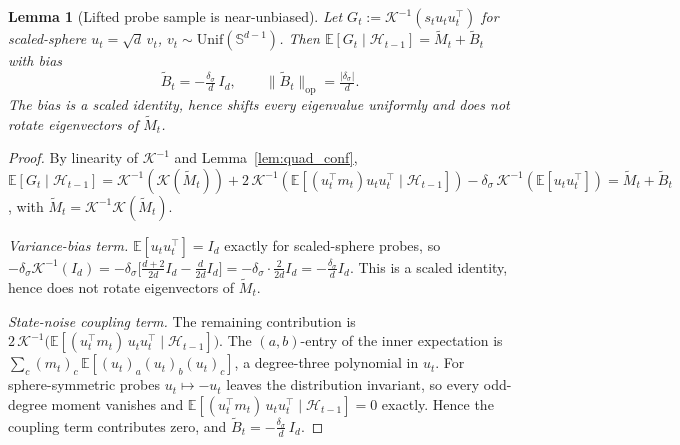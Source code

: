 \documentclass{article}
\newcommand{\E}{\mathbb{E}}
\newcommand{\op}{\mathrm{op}}
\newcommand{\cH}{\mathcal{H}}
\newtheorem{lemma}[theorem]{Lemma}
\begin{document}
\begin{lemma}[Lifted probe sample is near-unbiased]
\label{lem:G_unbiased_conf}
Let $G_t := \mathcal K^{-1}(s_t u_tu_t^\top)$ for scaled-sphere
$u_t = \sqrt d\,v_t$, $v_t\sim\mathrm{Unif}(\mathbb S^{d-1})$. Then
$\E[G_t\mid\cH_{t-1}] = \widetilde M_t + \widetilde B_t$ with bias
\[
  \widetilde B_t = -\tfrac{\delta_\sigma}{d}\,I_d, \qquad
  \|\widetilde B_t\|_\op = \tfrac{|\delta_\sigma|}{d}.
  \]
  The bias is a scaled identity, hence shifts every eigenvalue
  uniformly and does not rotate eigenvectors of $\widetilde M_t$.
\end{lemma}
\begin{proof}
By linearity of $\mathcal K^{-1}$ and Lemma~\ref{lem:quad_conf},
$\E[G_t\mid\cH_{t-1}] = \mathcal K^{-1}(\mathcal K(\widetilde M_t))
+ 2\,\mathcal K^{-1}(\E[(u_t^\top m_t)u_tu_t^\top\mid\cH_{t-1}])
- \delta_\sigma\,\mathcal K^{-1}(\E[u_tu_t^\top])
= \widetilde M_t + \widetilde B_t$,
with $\widetilde M_t = \mathcal K^{-1}\mathcal K(\widetilde M_t)$.

\emph{Variance-bias term.} $\E[u_tu_t^\top] = I_d$ exactly for
scaled-sphere probes, so
$-\delta_\sigma\mathcal K^{-1}(I_d) = -\delta_\sigma\bigl[\tfrac{d+2}{2d}I_d - \tfrac{d}{2d}I_d\bigr]
= -\delta_\sigma\cdot\tfrac{2}{2d}I_d = -\tfrac{\delta_\sigma}{d}I_d$.
This is a scaled identity, hence does not rotate eigenvectors of
$\widetilde M_t$.

\emph{State-noise coupling term.} The remaining contribution is
  $2\,\mathcal K^{-1}\bigl(\E[(u_t^\top m_t)\,u_tu_t^\top\mid\cH_{t-1}]\bigr)$.
  The $(a,b)$-entry of the inner expectation is
  $\sum_c (m_t)_c\,\E[(u_t)_a(u_t)_b(u_t)_c]$, a degree-three polynomial
  in $u_t$. For sphere-symmetric probes $u_t \mapsto -u_t$ leaves the
  distribution invariant, so every odd-degree moment vanishes and
  $\E[(u_t^\top m_t)\,u_tu_t^\top\mid\cH_{t-1}] = 0$ exactly. Hence the
  coupling term contributes zero, and
  $\widetilde B_t = -\tfrac{\delta_\sigma}{d}\,I_d$.
\end{proof}
\end{document}
